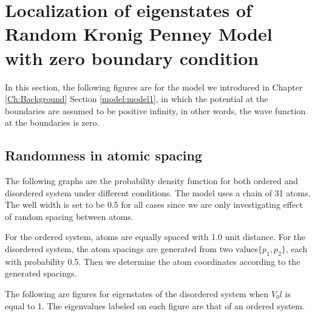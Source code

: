 \newpage
\section{Localization of eigenstates of Random Kronig Penney Model with zero boundary condition}\label{sec: localization}
In this section, the following figures are for the model we introduced in Chapter \ref{Ch:Background} Section \ref{model:model1}, in which the potential at the boundaries are assumed to be positive infinity, in other words, the wave function at the boundaries is zero.

\subsection{Randomness in atomic spacing}\label{subsec:Randomness in atomic spacing}
The following graphs are the probability density function for both ordered and disordered system under different conditions. The model uses a chain of 31 atoms. The well width is set to be 0.5 for all cases since we are only investigating effect of random spacing between atoms. 

For the ordered system, atoms are equally spaced with 1.0 unit distance.
For the disordered system, the atom spacings are generated from two values$\{p_1,p_2\}$, each with probability 0.5. Then we determine the atom coordinates according to the generated spacings. 

The following are figures for eigenstates of the disordered system when $V_0l$ is equal to 1.
The eigenvalues labeled on each figure are that of an ordered system. 


